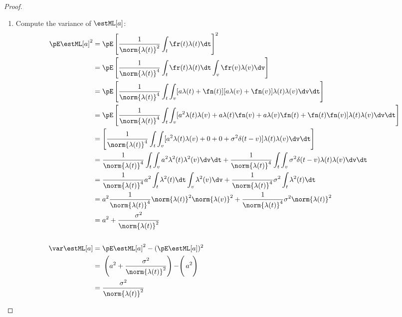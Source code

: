 {\begin{proof}
\begin{enumerate}
\item Compute the variance of $\estML[a]$:
\begin{align*}
  \pE \estML[a]^2
    &= \pE \left[ \frac{1}{\norm{\lambda(t)}^2} \int_t \fr(t)\lambda(t) \dt\right]^2
  \\&= \pE \left[  \frac{1}{\norm{\lambda(t)}^4}
        \int_t \fr(t)\lambda(t) \dt \int_v \fr(v)\lambda(v) \dv
        \right]
  \\&= \pE \left[  \frac{1}{\norm{\lambda(t)}^4}
        \int_t \int_v [a\lambda(t) + \fn(t)][a\lambda(v) + \fn(v)]
        \lambda(t) \lambda(v)
        \dv\dt \right]
  \\&= \pE \left[  \frac{1}{\norm{\lambda(t)}^4}
        \int_t \int_v
        [a^2\lambda(t)\lambda(v) + a\lambda(t)\fn(v) + a\lambda(v)\fn(t) + \fn(t)\fn(v)]
        \lambda(t) \lambda(v)
        \dv\dt \right]
  \\&= \left[  \frac{1}{\norm{\lambda(t)}^4}
        \int_t \int_v
        [a^2\lambda(t)\lambda(v) + 0 + 0 + \sigma^2\delta(t-v)]
        \lambda(t) \lambda(v)
        \dv\dt \right]
  \\&= \frac{1}{\norm{\lambda(t)}^4}
        \int_t \int_v a^2\lambda^2(t)\lambda^2(v) \dv\dt +
        \frac{1}{\norm{\lambda(t)}^4}
        \int_t \int_v \sigma^2\delta(t-v) \lambda(t) \lambda(v) \dv\dt
  \\&= \frac{1}{\norm{\lambda(t)}^4}
        a^2 \int_t \lambda^2(t) \dt \int_v \lambda^2(v) \dv +
        \frac{1}{\norm{\lambda(t)}^4}
        \sigma^2\int_t \lambda^2(t) \dt
  \\&= a^2 \frac{1}{\norm{\lambda(t)}^4}
        \norm{\lambda(t)}^2 \norm{\lambda(v)}^2 +
        \frac{1}{\norm{\lambda(t)}^4}
        \sigma^2 \norm{\lambda(t)}^2
  \\&= a^2 + \frac{\sigma^2}{\norm{\lambda(t)}^2}
\\
\\
  \var\estML[a]
    &= \pE \estML[a]^2 - (\pE \estML[a])^2
  \\&= \left.\left.\left(a^2 + \frac{\sigma^2}{\norm{\lambda(t)}^2}\right) - \right( a^2 \right)
  \\&= \frac{\sigma^2}{\norm{\lambda(t)}^2}
\end{align*}


\end{enumerate}
\end{proof}}
